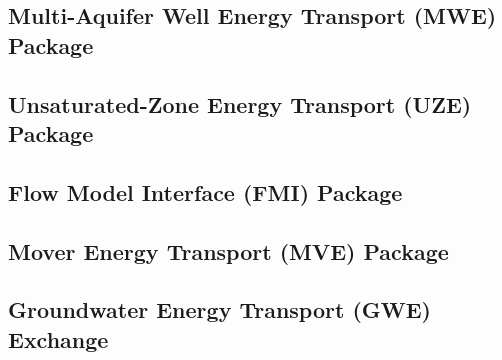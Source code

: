 \newpage
\subsection{Multi-Aquifer Well Energy Transport (MWE) Package}


\newpage
\subsection{Unsaturated-Zone Energy Transport (UZE) Package}


\newpage
\subsection{Flow Model Interface (FMI) Package}


\newpage
\subsection{Mover Energy Transport (MVE) Package}


\newpage
\subsection{Groundwater Energy Transport (GWE) Exchange}


